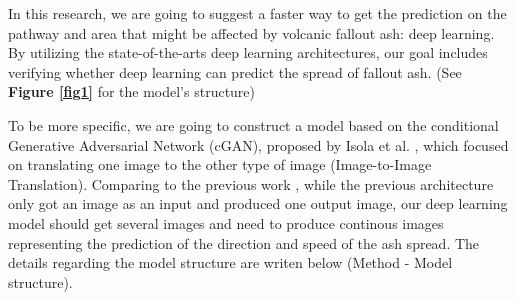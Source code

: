 \documentclass{article}
\begin{document}
\begin{doublespacing}
{  In this research, we are going to suggest a faster way to get the prediction on the pathway and 
  area that might be affected by volcanic fallout ash: deep learning. By utilizing the
  state-of-the-arts deep learning architectures, our goal includes verifying whether deep learning 
  can predict the spread of fallout ash. (See \textbf{Figure \ref{fig1}} for the model's structure)

  \fontsize{10pt}{10.5pt} 

  To be more specific, we are going to construct a model based on the conditional Generative 
  Adversarial Network (cGAN), proposed by Isola et al. \cite{isola2016imagetoimage}, which focused 
  on translating one image to the other type of image (Image-to-Image Translation). Comparing to the 
  previous work \cite{isola2016imagetoimage}, while the previous architecture only got an image as 
  an input and produced one output image, our deep learning model should get several images and need
  to produce continous images representing the prediction of the direction and speed of the ash 
  spread. The details regarding the model structure are writen below (Method - Model structure).
}


\end{doublespacing}
\end{document}
